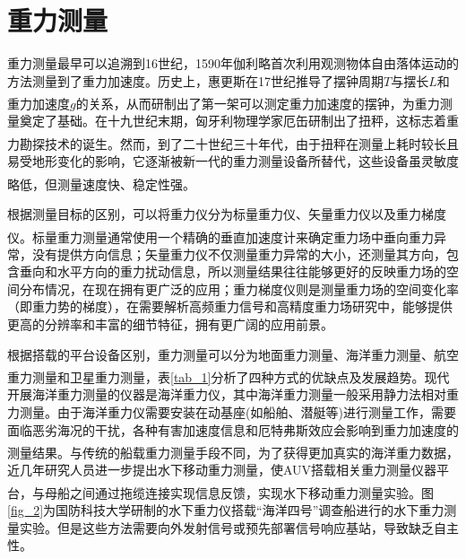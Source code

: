 \documentclass[12pt,a4,utf8]{article}
\newcommand{\upcite}[1]{\textsuperscript{\textsuperscript{\cite{#1}}}} %
\begin{document}
\section{重力测量}
      重力测量最早可以追溯到16世纪，1590年伽利略首次利用观测物体自由落体运动的方法测量到了重力加速度。历史上，惠更斯在17世纪推导了摆钟周期$T$与摆长$L$和重力加速度$g$的关系，从而研制出了第一架可以测定重力加速度的摆钟\upcite{snelders1989christiaan}，为重力测量奠定了基础。在十九世纪末期，匈牙利物理学家厄缶研制出了扭秤，这标志着重力勘探技术的诞生\upcite{szabo2016history,veryaskin2021gravity}。然而，到了二十世纪三十年代，由于扭秤在测量上耗时较长且易受地形变化的影响，它逐渐被新一代的重力测量设备所替代，这些设备虽灵敏度略低，但测量速度快、稳定性强\upcite{chendaiyong}。

根据测量目标的区别，可以将重力仪分为标量重力仪、矢量重力仪以及重力梯度仪\upcite{schwarz1995some}。标量重力测量通常使用一个精确的垂直加速度计来确定重力场中垂向重力异常，没有提供方向信息；矢量重力仪不仅测量重力异常的大小，还测量其方向，包含垂向和水平方向的重力扰动信息，所以测量结果往往能够更好的反映重力场的空间分布情况，在现在拥有更广泛的应用；重力梯度仪则是测量重力场的空间变化率（即重力势的梯度），在需要解析高频重力信号和高精度重力场研究中，能够提供更高的分辨率和丰富的细节特征，拥有更广阔的应用前景。

根据搭载的平台设备区别，重力测量可以分为地面重力测量、海洋重力测量、航空重力测量和卫星重力测量\upcite{hirt2013new,liang2020high,kwon2001new}，表\ref{tab_1}分析了四种方式的优缺点及发展趋势。现代开展海洋重力测量的仪器是海洋重力仪，其中海洋重力测量一般采用静力法相对重力测量。由于海洋重力仪需要安装在动基座(如船舶、潜艇等)进行测量工作，需要面临恶劣海况的干扰，各种有害加速度信息和厄特弗斯效应会影响到重力加速度的测量结果\upcite{ZGZC201808001017}。与传统的船载重力测量手段不同，为了获得更加真实的海洋重力数据，近几年研究人员进一步提出水下移动重力测量，使AUV搭载相关重力测量仪器平台，与母船之间通过拖缆连接实现信息反馈，实现水下移动重力测量实验\upcite{1021532813.nh}。图\ref{fig_2}为国防科技大学研制的水下重力仪搭载“海洋四号”调查船进行的水下重力测量实验。但是这些方法需要向外发射信号或预先部署信号响应基站，导致缺乏自主性。
\end{document}
